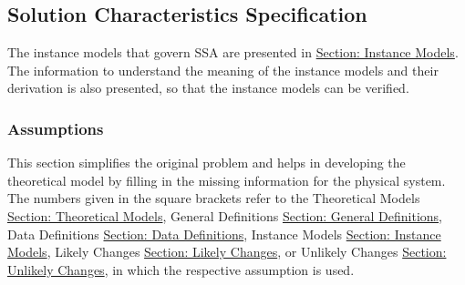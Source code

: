 \documentclass[12pt]{article}
\begin{document}
\subsection{Solution Characteristics Specification}
\label{Sec:SolCharSpec}
The instance models that govern SSA are presented in \hyperref[Sec:IMs]{Section: Instance Models}. The information to understand the meaning of the instance models and their derivation is also presented, so that the instance models can be verified.
\subsubsection{Assumptions}
\label{Sec:Assumps}
This section simplifies the original problem and helps in developing the theoretical model by filling in the missing information for the physical system. The numbers given in the square brackets refer to the Theoretical Models \hyperref[Sec:TMs]{Section: Theoretical Models}, General Definitions \hyperref[Sec:GDs]{Section: General Definitions}, Data Definitions \hyperref[Sec:DDs]{Section: Data Definitions}, Instance Models \hyperref[Sec:IMs]{Section: Instance Models}, Likely Changes \hyperref[Sec:LCs]{Section: Likely Changes}, or Unlikely Changes \hyperref[Sec:UCs]{Section: Unlikely Changes}, in which the respective assumption is used.
\end{document}
